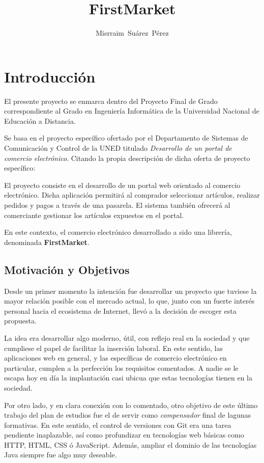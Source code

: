 \documentclass[a4paper]{article}
\author{Misrraim~Su\'arez~P\'erez}
\title{FirstMarket}
\begin{document}
    \maketitle
    \tableofcontents

    \section{Introducción}
    El presente proyecto se enmarca dentro del Proyecto Final de Grado correspondiente al Grado en Ingeniería Informática de la Universidad Nacional de Educación a Distancia.
    
    Se basa en el proyecto específico ofertado por el Departamento de Sistemas de Comunicación y Control de la UNED titulado \emph{Desarrollo de un portal de comercio electrónico}. Citando la propia descripción de dicha oferta de proyecto específico:
    
    \begin{displayquote}
        El proyecto consiste en el desarrollo de un portal web orientado al comercio electrónico. Dicha aplicación permitirá al comprador seleccionar artículos, realizar pedidos y pagos a través de una pasarela. El sistema también ofrecerá al comerciante gestionar los artículos expuestos en el portal.
    \end{displayquote}

	En este contexto, el comercio electrónico desarrollado a sido una librería, denominada \textbf{FirstMarket}.

    \subsection{Motivación y Objetivos}
    Desde un primer momento la intención fue desarrollar un proyecto que tuviese la mayor relación posible con el mercado actual, lo que, junto con un fuerte interés personal hacia el ecosistema de Internet, llevó a la decisión de escoger esta propuesta.
    
    La idea era desarrollar algo moderno, útil, con reflejo real en la sociedad y que cumpliese el papel de facilitar la inserción laboral. En este sentido, las aplicaciones web en general, y las específicas de comercio electrónico en particular, cumplen a la perfección los requisitos comentados. A nadie se le escapa hoy en día la implantación casi ubicua que estas tecnologías tienen en la sociedad.
    
    Por otro lado, y en clara conexión con lo comentado, otro objetivo de este último trabajo del plan de estudios fue el de servir como \emph{compensador} final de lagunas formativas. En este sentido, el control de versiones con Git era una tarea pendiente inaplazable, así como profundizar en tecnologías web básicas como HTTP, HTML, CSS ó JavaScript. Además, ampliar el dominio de las tecnologías Java siempre fue algo muy deseable.
    
\end{document}
